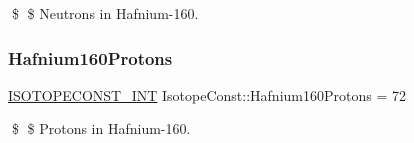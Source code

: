 \$ \$ Neutrons in Hafnium-\/160. \mbox{\label{group___isotope_const-_hafnium-_hf160_ga3a0389ca24ec4b2175a2037ee8596ed9}} 
\subsubsection{\texorpdfstring{Hafnium160\+Protons}{Hafnium160Protons}}
{\footnotesize\ttfamily \mbox{\hyperlink{group___isotope_const-_macros_ga5f18360b3e99483a35c32d789e62621c}{I\+S\+O\+T\+O\+P\+E\+C\+O\+N\+S\+T\+\_\+\+I\+NT}} Isotope\+Const\+::\+Hafnium160\+Protons = 72}

\$ \$ Protons in Hafnium-\/160. 